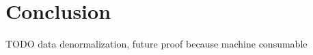 \section{Conclusion}\label{conclusion}

TODO data denormalization, future proof because machine consumable
